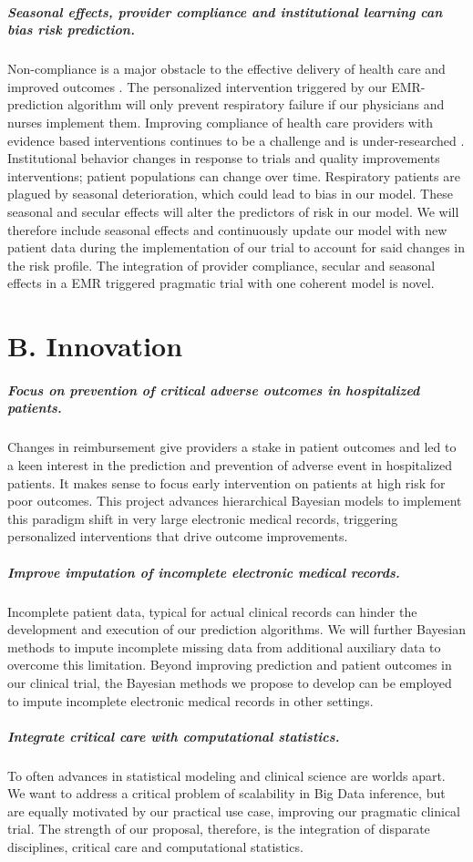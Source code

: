 \documentclass[11pt,notitlepage]{article}
\begin{document}
\subparagraph*{Seasonal effects, provider compliance and institutional learning can bias risk prediction.} 
Non-compliance is a major obstacle to the effective delivery of health care and improved outcomes \cite{Duncan_16710766}. The personalized intervention triggered by our EMR-prediction algorithm will only prevent respiratory failure if our physicians and nurses implement them. Improving compliance of health care providers with evidence based interventions continues to be a challenge and is under-researched \cite{Davis_7650822}. Institutional behavior changes in response to trials and quality improvements interventions; patient populations can change over time. Respiratory patients are plagued by seasonal deterioration, which could lead to bias in our model. These seasonal and secular effects will alter the predictors of risk in our model. We will therefore include seasonal effects and continuously update our model with new patient data during the implementation of our trial to account for said changes in the risk profile. The integration of provider compliance, secular and seasonal effects in a EMR triggered pragmatic trial with one coherent model is novel. 

\section*{B. Innovation}
\subparagraph*{Focus on prevention of critical adverse outcomes in hospitalized patients.}
Changes in reimbursement give providers a stake in patient outcomes and led to a keen interest in the prediction and prevention of adverse event in hospitalized patients. It makes sense to focus early intervention on patients at high risk for poor outcomes. This project advances hierarchical Bayesian models to implement this paradigm shift in very large electronic medical records, triggering personalized interventions that drive outcome improvements.

\subparagraph*{Improve imputation of incomplete electronic medical records.}
Incomplete patient data, typical for actual clinical records can hinder the development and execution of our prediction algorithms. We will further Bayesian methods to impute incomplete missing data from additional auxiliary data to overcome this limitation. Beyond improving prediction and patient outcomes in our clinical trial, the Bayesian methods we propose to develop can be employed to impute incomplete electronic medical records in other settings.

\subparagraph*{Integrate critical care with computational statistics.}
To often advances in statistical modeling and clinical science are worlds apart. We want to address a critical problem of scalability in Big Data inference, but are equally motivated by our practical use case, improving our pragmatic clinical trial. The strength of our proposal, therefore, is the integration of disparate disciplines, critical care and computational statistics. 
\end{document}
